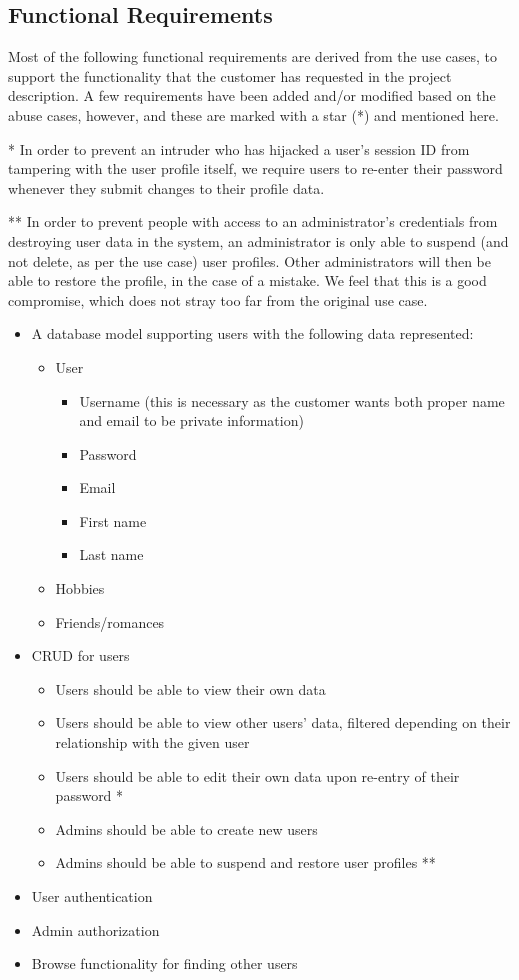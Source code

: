 \documentclass[a4paper]{article}
\begin{document}
\subsection{Functional Requirements}
Most of the following functional requirements are derived from the use cases, to support the functionality that the customer has requested in the project description. A few requirements have been added and/or modified based on the abuse cases, however, and these are marked with a star (*) and mentioned here.

* In order to prevent an intruder who has hijacked a user's session ID from tampering with the user profile itself, we require users to re-enter their password whenever they submit changes to their profile data.

** In order to prevent people with access to an administrator's credentials from destroying user data in the system, an administrator is only able to suspend (and not delete, as per the use case) user profiles. Other administrators will then be able to restore the profile, in the case of a mistake. We feel that this is a good compromise, which does not stray too far from the original use case.
\begin{itemize}
\item A database model supporting users with the following data represented:
  \begin{itemize}
  \item User
      \begin{itemize}
      \item Username (this is necessary as the customer wants both proper name and email to be private information)
      \item Password
      \item Email
      \item First name
      \item Last name
      \end{itemize}
  \item Hobbies
  \item Friends/romances
  \end{itemize}
\item CRUD for users
	\begin{itemize}
    \item Users should be able to view their own data
    \item Users should be able to view other users' data, filtered depending on their relationship with the given user
    \item Users should be able to edit their own data upon re-entry of their password *
    \item Admins should be able to create new users
    \item Admins should be able to suspend and restore user profiles **
    \end{itemize}
\item User authentication
\item Admin authorization
\item Browse functionality for finding other users
\end{itemize}
\end{document}
